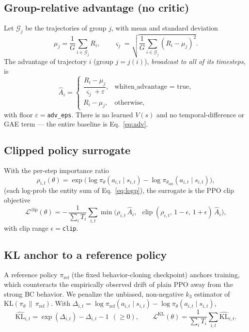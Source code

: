 \documentclass[11pt]{article}
\newcommand{\KL}{\mathrm{KL}}
\newcommand{\clip}{\operatorname{clip}}
\newcommand{\Adv}{\hat{A}}
\newcommand{\pol}{\pi_\theta}
\newcommand{\polold}{\pi_{\theta_{\mathrm{old}}}}
\newcommand{\polref}{\pi_{\mathrm{ref}}}
\begin{document}
\subsection{Group-relative advantage (no critic)}
Let $\mathcal{G}_j$ be the trajectories of group $j$, with mean and standard deviation
\begin{equation}
\mu_j = \frac{1}{G}\sum_{i\in\mathcal{G}_j} R_i,
\qquad
\varsigma_j = \sqrt{\frac{1}{G}\sum_{i\in\mathcal{G}_j}(R_i-\mu_j)^2}.
\end{equation}
The advantage of trajectory $i$ (group $j=j(i)$), \emph{broadcast to all of its timesteps}, is
\begin{equation}
\boxed{\;
\Adv_i =
\begin{cases}
\dfrac{R_i-\mu_j}{\varsigma_j+\varepsilon}, & \text{whiten\_advantage = true},\\[1.2em]
R_i-\mu_j, & \text{otherwise,}
\end{cases}
\;}
\label{eq:adv}
\end{equation}
with floor $\varepsilon=$\texttt{adv\_eps}. There is no learned $V(s)$ and no temporal-difference
or GAE term --- the entire baseline is Eq.~\eqref{eq:adv}.

\subsection{Clipped policy surrogate}
With the per-step importance ratio
\begin{equation}
\rho_{i,t}(\theta) = \exp\!\Big(\log\pol(a_{i,t}\mid s_{i,t}) - \log\polold(a_{i,t}\mid s_{i,t})\Big),
\end{equation}
(each log-prob the entity sum of Eq.~\eqref{eq:logp}), the surrogate is the PPO clip objective
\begin{equation}
\mathcal{L}^{\mathrm{clip}}(\theta) =
-\,\frac{1}{\sum_i T_i}\sum_{i,t}
\min\!\Big(\rho_{i,t}\,\Adv_i,\ \ \clip(\rho_{i,t},\,1-\epsilon,\,1+\epsilon)\,\Adv_i\Big),
\label{eq:clip}
\end{equation}
with clip range $\epsilon=$\texttt{clip}.

\subsection{KL anchor to a reference policy}\label{sec:kl}
A reference policy $\polref$ (the fixed behavior-cloning checkpoint) anchors training, which
counteracts the empirically observed drift of plain PPO away from the strong BC behavior. We
penalize the unbiased, non-negative $k_3$ estimator of $\KL(\pol\,\|\,\polref)$. With
$\Delta_{i,t}=\log\polref(a_{i,t}\mid s_{i,t})-\log\pol(a_{i,t}\mid s_{i,t})$,
\begin{equation}
\widehat{\KL}_{i,t} = \exp(\Delta_{i,t}) - \Delta_{i,t} - 1 \ \ (\geq 0),
\qquad
\mathcal{L}^{\mathrm{KL}}(\theta) = \frac{1}{\sum_i T_i}\sum_{i,t}\widehat{\KL}_{i,t}.
\label{eq:kl}
\end{equation}
\end{document}
